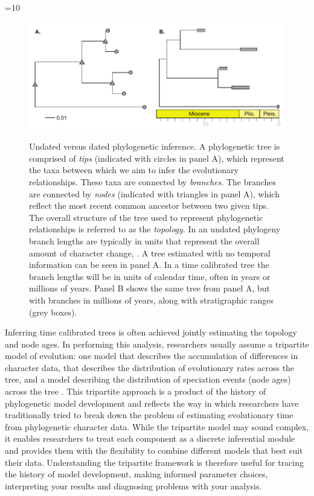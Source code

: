 \ifnum\value{num}=10 {
\begin{figure}[h!]
\centering
\includegraphics[width=\textwidth]{Cambridge-Elements/manuscript.R2/submitted_figs//figure1}
\label{fig:undated}
\caption{Undated versus dated phylogenetic inference.
A phylogenetic tree is comprised of \textit{tips} (indicated with circles in panel A), which represent the taxa between which we aim to infer the evolutionary relationships.
These taxa are connected by \textit{branches}. 
The branches are connected by \textit{nodes} (indicated with triangles in panel A), which reflect the most recent common ancestor between two given tips. 
The overall structure of the tree used to represent phylogenetic relationships is referred to as the \textit{topology}.
In an undated phylogeny branch lengths are typically in units that represent the overall amount of character change, .
A tree estimated with no temporal information can be seen in panel A.
In a time calibrated tree the branch lengths will be in units of calendar time, often in years or millions of years. 
Panel B shows the same tree from panel A, but with branches in millions of years, along with stratigraphic ranges (grey boxes).}
\label{fig:undated}
\end{figure} }\else{}\fi

Inferring time calibrated trees is often achieved  jointly estimating the topology and node ages.
In performing this analysis, researchers usually assume a tripartite model of evolution: one model that describes the accumulation of differences in character data,  that describes the distribution of evolutionary rates across the tree, and a  model describing the distribution of speciation events (node ages) across the tree \citep{Thorne1998,Kishino2001,Yang2006,Drummond2006}.
This tripartite approach is a product of the history of phylogenetic model development and reflects the way in which researchers have traditionally tried to break down the problem of estimating evolutionary time from phylogenetic character data.
While the tripartite model may sound complex, it enables researchers to treat each component as a discrete inferential module and provides them with the flexibility to combine different models that best suit their data.
Understanding the tripartite framework is therefore useful for tracing the history of model development, making informed parameter choices, interpreting your results and diagnosing problems with your analysis.

